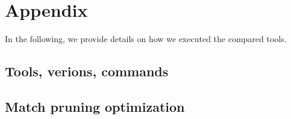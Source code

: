 \chapter{Appendix} \label{ch:appendix}

In the following, we provide details on how we executed the compared tools.

\section{Tools, verions, commands} \label{sec:commands}


\section{Match pruning optimization} \label{sec:pruning}


